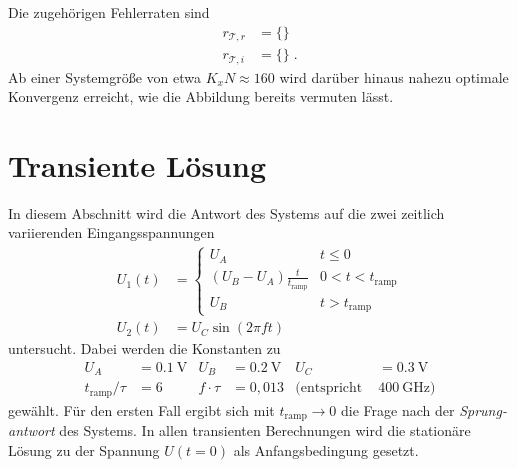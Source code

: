 Die zugehörigen Fehlerraten sind
\begin{align*}
  r_{\mathcal{T},r} &= \{\} \\
  r_{\mathcal{T},i} &= \{\} \; .
\end{align*}
Ab einer Systemgröße von etwa $K_x N \approx 160$ wird darüber hinaus nahezu optimale Konvergenz erreicht, wie die Abbildung bereits vermuten lässt.



\section{Transiente Lösung}\label{sec:transient}
In diesem Abschnitt wird die Antwort des Systems auf die zwei zeitlich variierenden Eingangsspannungen
\begin{align*}
  U_1(t) &= \begin{cases} U_A & t\leq 0 \\ (U_B - U_A)\frac{t}{t_\text{ramp}} & 0<t<t_{\text{ramp}} \\ U_B & t>t_{\text{ramp}} \end{cases} \\
  U_2(t) &= U_C \sin(2\pi f t)
\end{align*}
untersucht. Dabei werden die Konstanten zu
\begin{align*}
  U_A &= \SI{0.1}{\volt} & U_B &= \SI{0.2}{\volt} & U_C &= \SI{0.3}{\volt} \\
  t_{\text{ramp}}/\tau &= 6  & f \cdot \tau &= 0,013 & \text{(entspricht }&\SI{400}{\giga\hertz}\text{)}
\end{align*}
gewählt. Für den ersten Fall ergibt sich mit $t_{\text{ramp}}\rightarrow 0$ die Frage nach der \emph{Sprung-antwort} des Systems. In allen transienten Berechnungen wird die stationäre Lösung zu der Spannung $U(t=0)$ als Anfangsbedingung gesetzt.

